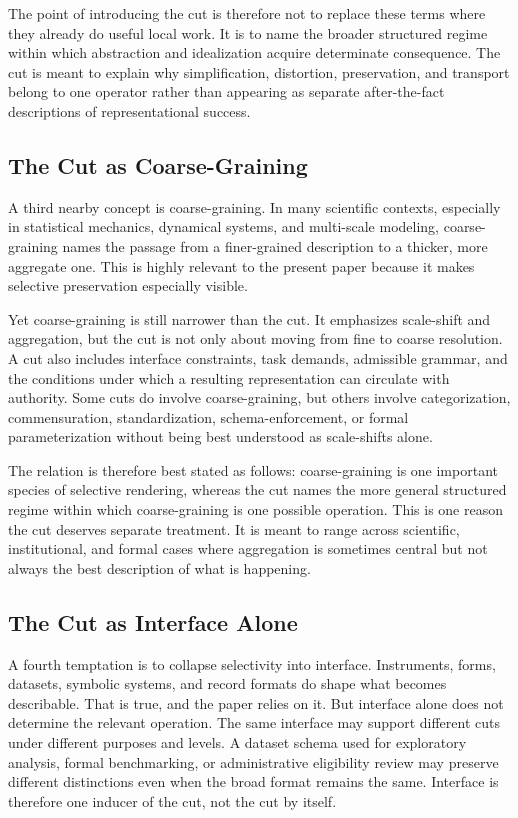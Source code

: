 \documentclass[11pt]{article}
\begin{document}
The point of introducing the cut is therefore not to replace these terms where they already do useful local work. It is to name the broader structured regime within which abstraction and idealization acquire determinate consequence. The cut is meant to explain why simplification, distortion, preservation, and transport belong to one operator rather than appearing as separate after-the-fact descriptions of representational success.

\subsection{The Cut as Coarse-Graining}

A third nearby concept is coarse-graining. In many scientific contexts, especially in statistical mechanics, dynamical systems, and multi-scale modeling, coarse-graining names the passage from a finer-grained description to a thicker, more aggregate one. This is highly relevant to the present paper because it makes selective preservation especially visible. \cite{levels_org_biology_sep}

Yet coarse-graining is still narrower than the cut. It emphasizes scale-shift and aggregation, but the cut is not only about moving from fine to coarse resolution. A cut also includes interface constraints, task demands, admissible grammar, and the conditions under which a resulting representation can circulate with authority. Some cuts do involve coarse-graining, but others involve categorization, commensuration, standardization, schema-enforcement, or formal parameterization without being best understood as scale-shifts alone.

The relation is therefore best stated as follows: coarse-graining is one important species of selective rendering, whereas the cut names the more general structured regime within which coarse-graining is one possible operation. This is one reason the cut deserves separate treatment. It is meant to range across scientific, institutional, and formal cases where aggregation is sometimes central but not always the best description of what is happening.

\subsection{The Cut as Interface Alone}

A fourth temptation is to collapse selectivity into interface. Instruments, forms, datasets, symbolic systems, and record formats do shape what becomes describable. That is true, and the paper relies on it. But interface alone does not determine the relevant operation. The same interface may support different cuts under different purposes and levels. A dataset schema used for exploratory analysis, formal benchmarking, or administrative eligibility review may preserve different distinctions even when the broad format remains the same. Interface is therefore one inducer of the cut, not the cut by itself. \cite{adriaans_information_sep,star_ethnography_of_infrastructure,bowker_star_sorting_things_out}
\end{document}
